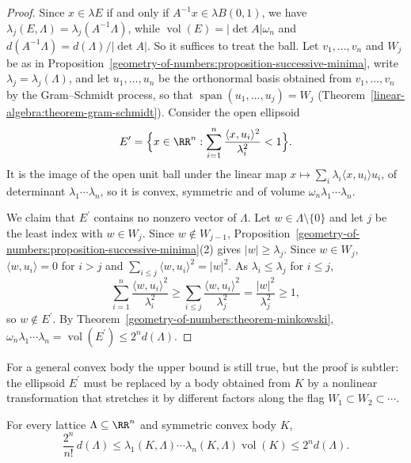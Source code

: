 \begin{proof}
Since $x \in \lambda E$ if and only if $A^{-1}x \in \lambda B(0, 1)$, we have $\lambda_j(E, \Lambda) = \lambda_j(A^{-1}\Lambda)$, while $\operatorname{vol}(E) = |\det A|\omega_n$ and
$d(A^{-1}\Lambda) = d(\Lambda)/|\det A|$. So it suffices to treat the ball. Let $v_1, \ldots, v_n$ and $W_j$ be as in Proposition~\ref{geometry-of-numbers:proposition-successive-minima}, write
$\lambda_j = \lambda_j(\Lambda)$, and let $u_1, \ldots, u_n$ be the orthonormal basis obtained from $v_1, \ldots, v_n$ by the Gram--Schmidt process, so that
$\operatorname{span}(u_1, \ldots, u_j) = W_j$ (Theorem~\ref{linear-algebra:theorem-gram-schmidt}). Consider the open ellipsoid
\[
E^{\prime} = \Bigl\{x \in \RR^n : \sum_{i=1}^n\frac{\langle x, u_i \rangle^2}{\lambda_i^2} < 1\Bigr\}.
\]
It is the image of the open unit ball under the linear map $x \mapsto \sum_i\lambda_i\langle x, u_i \rangle u_i$, of determinant $\lambda_1\cdots\lambda_n$, so it is convex, symmetric and of volume
$\omega_n\lambda_1\cdots\lambda_n$.

We claim that $E^{\prime}$ contains no nonzero vector of $\Lambda$. Let $w \in \Lambda \setminus \{0\}$ and let $j$ be the least index with $w \in W_j$. Since $w \notin W_{j-1}$,
Proposition~\ref{geometry-of-numbers:proposition-successive-minima}(2) gives $|w| \geq \lambda_j$. Since $w \in W_j$, $\langle w, u_i \rangle = 0$ for $i > j$ and
$\sum_{i \leq j}\langle w, u_i \rangle^2 = |w|^2$. As $\lambda_i \leq \lambda_j$ for $i \leq j$,
\[
\sum_{i=1}^n\frac{\langle w, u_i \rangle^2}{\lambda_i^2} \geq \sum_{i \leq j}\frac{\langle w, u_i \rangle^2}{\lambda_j^2} = \frac{|w|^2}{\lambda_j^2} \geq 1,
\]
so $w \notin E^{\prime}$. By Theorem~\ref{geometry-of-numbers:theorem-minkowski}, $\omega_n\lambda_1\cdots\lambda_n = \operatorname{vol}(E^{\prime}) \leq 2^nd(\Lambda)$.
\end{proof}

For a general convex body the upper bound is still true, but the proof is subtler: the ellipsoid $E^{\prime}$ must be replaced by a body obtained from $K$ by a nonlinear transformation that stretches
it by different factors along the flag $W_1 \subset W_2 \subset \cdots$.

\begin{theorem}\label{geometry-of-numbers:theorem-minkowski-second}
For every lattice $\Lambda \subseteq \RR^n$ and symmetric convex body $K$,
\[
\frac{2^n}{n!}\,d(\Lambda) \leq \lambda_1(K, \Lambda)\cdots\lambda_n(K, \Lambda)\operatorname{vol}(K) \leq 2^nd(\Lambda).
\]
\end{theorem}

